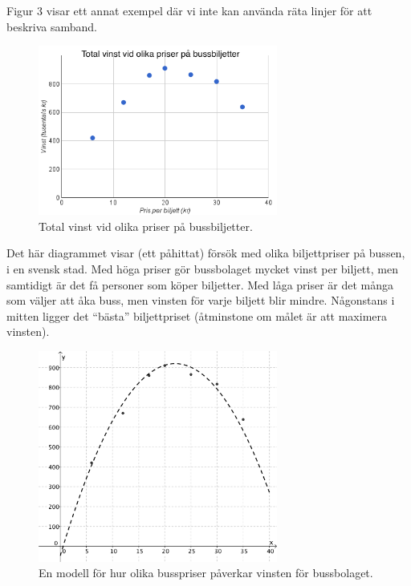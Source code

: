 Figur 3 visar ett annat exempel där vi inte kan använda räta linjer för att beskriva samband.

\begin{figure}
  \centering
  \includegraphics[width=0.7\textwidth]{bilder/busspriser.png}
  \caption{\label{fig:busspriser}Total vinst vid olika priser på bussbiljetter.}
\end{figure}

Det här diagrammet visar (ett påhittat) försök med olika biljettpriser på bussen, i en svensk stad.
Med höga priser gör bussbolaget mycket vinst per biljett, men samtidigt är det få personer som köper biljetter.
Med låga priser är det många som väljer att åka buss, men vinsten för varje biljett blir mindre.
Någonstans i mitten ligger det ``bästa'' biljettpriset (åtminstone om målet är att maximera vinsten).

\begin{figure}
  \centering
  \includegraphics[width=0.7\textwidth]{bilder/busspriser-reg.png}
  \caption{\label{fig:busspriser-reg}En modell för hur olika busspriser påverkar vinsten för bussbolaget.}
\end{figure}


